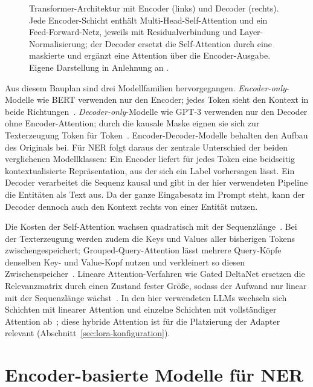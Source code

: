 \begin{figure}[htbp]
  \centering
  
  \caption[Transformer-Architektur mit Encoder und Decoder]{Transformer-Architektur mit Encoder (links) und Decoder
  (rechts).
  Jede Encoder-Schicht enthält Multi-Head-Self-Attention und ein
  Feed-Forward-Netz, jeweils mit Residualverbindung und
  Layer-Normalisierung; der Decoder ersetzt die Self-Attention durch eine
  maskierte und ergänzt eine Attention über die Encoder-Ausgabe.
  Eigene Darstellung in Anlehnung an \textcite[Abb.~1]{vaswani2017attention}.}
  \label{fig:transformer-architektur}
\end{figure}

Aus diesem Bauplan sind drei Modellfamilien hervorgegangen.
\emph{Encoder-only}-Modelle wie BERT verwenden nur den Encoder; jedes
Token sieht den Kontext in beide Richtungen~\cite{devlin2019bert}.
\emph{Decoder-only}-Modelle wie GPT-3 verwenden nur den Decoder ohne
Encoder-Attention; durch die kausale Maske eignen sie sich zur
Texterzeugung Token für Token~\cite{brown2020language}.
Encoder-Decoder-Modelle behalten den Aufbau des Originals bei.
Für NER folgt daraus der zentrale Unterschied der beiden verglichenen
Modellklassen: Ein Encoder liefert für jedes Token eine
beidseitig kontextualisierte Repräsentation, aus der sich ein Label
vorhersagen lässt.
Ein Decoder verarbeitet die Sequenz kausal und gibt in der hier
verwendeten Pipeline die Entitäten als Text aus. Da der ganze
Eingabesatz im Prompt steht, kann der Decoder dennoch auch den Kontext
rechts von einer Entität nutzen.

Die Kosten der Self-Attention wachsen quadratisch mit der
Sequenzlänge~\cite{vaswani2017attention}.
Bei der Texterzeugung werden zudem die Keys und Values aller bisherigen
Tokens zwischengespeichert; Grouped-Query-Attention lässt mehrere
Query-Köpfe denselben Key- und Value-Kopf nutzen und verkleinert so
diesen Zwischenspeicher~\cite{ainslie2023gqa}.
Lineare Attention-Verfahren wie Gated DeltaNet ersetzen die
Relevanzmatrix durch einen Zustand fester Größe, sodass der Aufwand nur
linear mit der Sequenzlänge wächst~\cite{yang2025gated}.
In den hier verwendeten LLMs wechseln sich Schichten mit linearer
Attention und einzelne Schichten mit vollständiger Attention ab~\cite{qwen2026card08b,qwen2026card4b,qwen2026card27b}; diese
hybride Attention ist für die Platzierung der Adapter relevant
(Abschnitt~\ref{sec:lora-konfiguration}).

\section{Encoder-basierte Modelle für NER}
\label{sec:encoder_ner}

